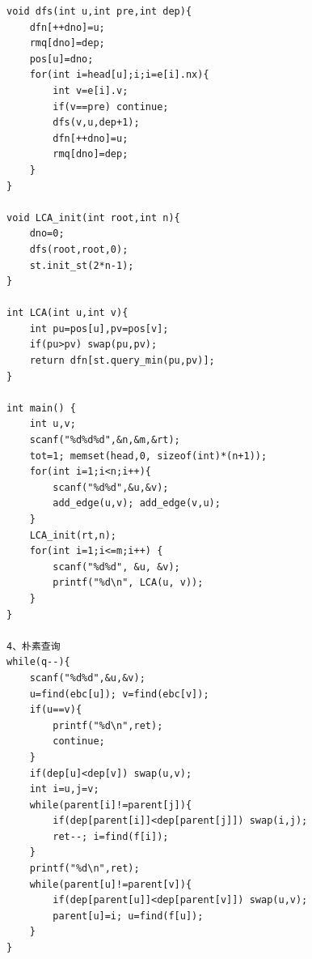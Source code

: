 \documentclass[twoside]{article}
\begin{document}
\begin{lstlisting}
void dfs(int u,int pre,int dep){
    dfn[++dno]=u;
    rmq[dno]=dep;
    pos[u]=dno;
    for(int i=head[u];i;i=e[i].nx){
        int v=e[i].v;
        if(v==pre) continue;
        dfs(v,u,dep+1);
        dfn[++dno]=u;
        rmq[dno]=dep;
    }
}

void LCA_init(int root,int n){
    dno=0;
    dfs(root,root,0);
    st.init_st(2*n-1);
}

int LCA(int u,int v){
    int pu=pos[u],pv=pos[v];
    if(pu>pv) swap(pu,pv);
    return dfn[st.query_min(pu,pv)];
}

int main() {
    int u,v;
    scanf("%d%d%d",&n,&m,&rt);
    tot=1; memset(head,0, sizeof(int)*(n+1));
    for(int i=1;i<n;i++){
        scanf("%d%d",&u,&v);
        add_edge(u,v); add_edge(v,u);
    }
    LCA_init(rt,n);
    for(int i=1;i<=m;i++) {
        scanf("%d%d", &u, &v);
        printf("%d\n", LCA(u, v));
    }
}

4、朴素查询
while(q--){
    scanf("%d%d",&u,&v);
    u=find(ebc[u]); v=find(ebc[v]);
    if(u==v){
        printf("%d\n",ret);
        continue;
    }
    if(dep[u]<dep[v]) swap(u,v);
    int i=u,j=v;
    while(parent[i]!=parent[j]){
        if(dep[parent[i]]<dep[parent[j]]) swap(i,j);
        ret--; i=find(f[i]);
    }
    printf("%d\n",ret);
    while(parent[u]!=parent[v]){
        if(dep[parent[u]]<dep[parent[v]]) swap(u,v);
        parent[u]=i; u=find(f[u]);
    }
}\end{lstlisting}
\end{document}
